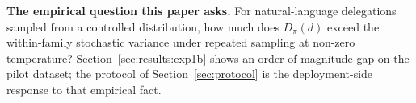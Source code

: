 \textbf{The empirical question this paper asks.} For natural-language delegations sampled from a controlled distribution, how much does $D_\pi(d)$ exceed the within-family stochastic variance under repeated sampling at non-zero temperature? Section~\ref{sec:results:exp1b} shows an order-of-magnitude gap on the pilot dataset; the protocol of Section~\ref{sec:protocol} is the deployment-side response to that empirical fact.
